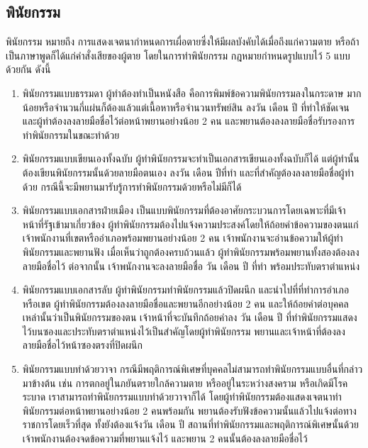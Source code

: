 \documentclass[12pt,oneside,openright,a4paper]{cpe-thai-project}
\begin{document}
\subsection{พินัยกรรม}
\tab พินัยกรรม หมายถึง การแสดงเจตนากำหนดการเผื่อตายซึ่งให้มีผลบังคับได้เมื่อถึงแก่ความตาย หรือถ้าเป็นภาษาพูดก็ได้แก่คำสั่งเสียของผู้ตาย โดยในการทำพินัยกรรม กฎหมายกำหนดรูปแบบไว้ 5 แบบด้วยกัน ดังนี้
\begin{enumerate}[label=\thesubsection.\arabic*,leftmargin=0pt,itemindent=2.5cm]
\item พินัยกรรมแบบธรรมดา ผู้ทำต้องทำเป็นหนังสือ คือการพิมพ์ข้อความพินัยกรรมลงในกระดาษ มากน้อยหรือจำนวนกี่แผ่นก็ต้องแล้วแต่เนื้อหาหรือจำนวนทรัพย์สิน   ลงวัน เดือน ปี ที่ทำให้ชัดเจน และผู้ทำต้องลงลายมือชื่อไว้ต่อหน้าพยานอย่างน้อย 2 คน และพยานต้องลงลายมือชื่อรับรองการทำพินัยกรรมในขณะทำด้วย
\item พินัยกรรมแบบเขียนเองทั้งฉบับ ผู้ทำพินัยกรรมจะทำเป็นเอกสารเขียนเองทั้งฉบับก็ได้ แต่ผู้ทำนั้นต้องเขียนพินัยกรรมนั้นด้วยลายมือตนเอง   ลงวัน เดือน ปีที่ทำ และที่สำคัญต้องลงลายมือชื่อผู้ทำด้วย กรณีนี้จะมีพยานมารับรู้การทำพินัยกรรมด้วยหรือไม่มีก็ได้
\item พินัยกรรมแบบเอกสารฝ่ายเมือง เป็นแบบพินัยกรรมที่ต้องอาศัยกระบวนการโดยเฉพาะที่มีเจ้าหน้าที่รัฐเข้ามาเกี่ยวข้อง   ผู้ทำพินัยกรรมต้องไปแจ้งความประสงค์โดยให้ถ้อยคำข้อความของตนแก่เจ้าพนักงานที่เขตหรืออำเภอพร้อมพยานอย่างน้อย 2 คน   เจ้าพนักงานจะอ่านข้อความให้ผู้ทำพินัยกรรมและพยานฟัง เมื่อเห็นว่าถูกต้องครบถ้วนแล้ว ผู้ทำพินัยกรรมพร้อมพยานทั้งสองต้องลงลายมือชื่อไว้   ต่อจากนั้น เจ้าพนักงานจะลงลายมือชื่อ วัน เดือน ปี ที่ทำ พร้อมประทับตราตำแหน่ง
\item พินัยกรรมแบบเอกสารลับ ผู้ทำพินัยกรรมทำพินัยกรรมแล้วปิดผนึก และนำไปที่ที่ทำการอำเภอหรือเขต   ผู้ทำพินัยกรรมต้องลงลายมือชื่อและพยานอีกอย่างน้อย 2 คน และให้ถ้อยคำต่อบุคคลเหล่านั้นว่าเป็นพินัยกรรมของตน   เจ้าหน้าที่จะบันทึกถ้อยคำลง วัน เดือน ปี ที่ทำพินัยกรรมแสดงไว้บนซองและประทับตราตำแหน่งไว้เป็นสำคัญโดยผู้ทำพินัยกรรม   พยานและเจ้าหน้าที่ต้องลงลายมือชื่อไว้หน้าซองตรงที่ปิดผนึก
\item พินัยกรรมแบบทำด้วยวาจา กรณีมีพฤติการณ์พิเศษที่บุคคลไม่สามารถทำพินัยกรรมแบบอื่นที่กล่าวมาข้างต้น เช่น การตกอยู่ในภยันตรายใกล้ความตาย หรืออยู่ในระหว่างสงคราม หรือเกิดมีโรคระบาด   เราสามารถทำพินัยกรรมแบบทำด้วยวาจาก็ได้ โดยผู้ทำพินัยกรรมต้องแสดงเจตนาทำพินัยกรรมต่อหน้าพยานอย่างน้อย 2 คนพร้อมกัน   พยานต้องรับฟังข้อความนั้นแล้วไปแจ้งต่อทางราชการโดยเร็วที่สุด ทั้งยังต้องแจ้งวัน เดือน ปี สถานที่ทำพินัยกรรมและพฤติการณ์พิเศษนั้นด้วย   เจ้าพนักงานต้องจดข้อความที่พยานแจ้งไว้ และพยาน 2 คนนั้นต้องลงลายมือชื่อไว้
\end{enumerate}
\end{document}
